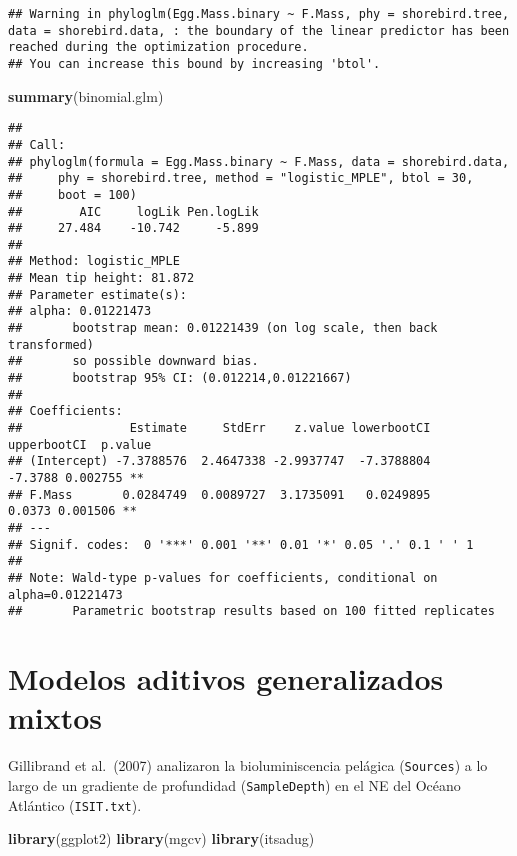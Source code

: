 \documentclass[
]{book}
\newenvironment{Shaded}{\begin{snugshade}}{\end{snugshade}}
\newcommand{\KeywordTok}[1]{\textcolor[rgb]{0.13,0.29,0.53}{\textbf{#1}}}
\newcommand{\NormalTok}[1]{#1}
\begin{document}
\begin{verbatim}
## Warning in phyloglm(Egg.Mass.binary ~ F.Mass, phy = shorebird.tree, data = shorebird.data, : the boundary of the linear predictor has been reached during the optimization procedure.
## You can increase this bound by increasing 'btol'.
\end{verbatim}

\begin{Shaded}
\begin{Highlighting}[]
\KeywordTok{summary}\NormalTok{(binomial.glm)}
\end{Highlighting}
\end{Shaded}

\begin{verbatim}
## 
## Call:
## phyloglm(formula = Egg.Mass.binary ~ F.Mass, data = shorebird.data, 
##     phy = shorebird.tree, method = "logistic_MPLE", btol = 30, 
##     boot = 100)
##        AIC     logLik Pen.logLik 
##     27.484    -10.742     -5.899 
## 
## Method: logistic_MPLE
## Mean tip height: 81.872
## Parameter estimate(s):
## alpha: 0.01221473 
##       bootstrap mean: 0.01221439 (on log scale, then back transformed)
##       so possible downward bias.
##       bootstrap 95% CI: (0.012214,0.01221667)
## 
## Coefficients:
##               Estimate     StdErr    z.value lowerbootCI upperbootCI  p.value   
## (Intercept) -7.3788576  2.4647338 -2.9937747  -7.3788804     -7.3788 0.002755 **
## F.Mass       0.0284749  0.0089727  3.1735091   0.0249895      0.0373 0.001506 **
## ---
## Signif. codes:  0 '***' 0.001 '**' 0.01 '*' 0.05 '.' 0.1 ' ' 1
## 
## Note: Wald-type p-values for coefficients, conditional on alpha=0.01221473
##       Parametric bootstrap results based on 100 fitted replicates
\end{verbatim}

\hypertarget{modelos-aditivos-generalizados-mixtos}{%
\section{Modelos aditivos generalizados mixtos}\label{modelos-aditivos-generalizados-mixtos}}

Gillibrand et al.~(2007) analizaron la bioluminiscencia pelágica (\texttt{Sources}) a lo largo de un gradiente de profundidad (\texttt{SampleDepth}) en el NE del Océano Atlántico (\texttt{ISIT.txt}).

\begin{Shaded}
\begin{Highlighting}[]
\KeywordTok{library}\NormalTok{(ggplot2)}
\KeywordTok{library}\NormalTok{(mgcv)}
\KeywordTok{library}\NormalTok{(itsadug)}
\end{Highlighting}
\end{Shaded}
\end{document}
